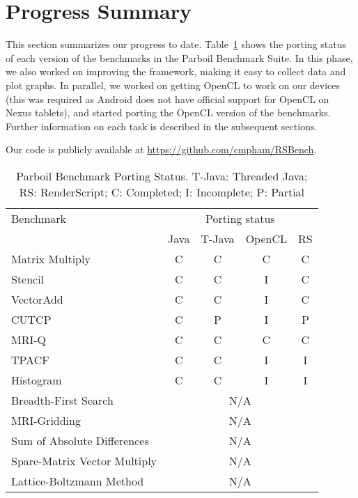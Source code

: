 \section*{Progress Summary}

This section summarizes our progress to date. Table~\ref{table:parboil} shows the
porting status of each version of the benchmarks in the Parboil Benchmark Suite.
In this phase, we also worked on improving the framework, making it easy to collect
data and plot graphs. In parallel, we worked on getting OpenCL to work on our
devices (this was required as Android does not have official support for OpenCL
on Nexus tablets), and started porting the OpenCL version of the benchmarks. 
Further information on each task is described in the subsequent sections.

Our code is publicly available at \url{https://github.com/cmpham/RSBench}.

\begin{table}[h]\small
\centering
\begin{tabular}{ | l | c | c | c | c |}
    \hline 
    Benchmark & \multicolumn{4}{|c|}{Porting status} \\ \cline{2-5}
              & Java & T-Java & OpenCL & RS \\ \hline
    Matrix Multiply & C & C & C & C \\ \hline
    Stencil & C & C & I & C \\ \hline
    VectorAdd & C & C & I & C \\ \hline
    CUTCP & C & P  & I  & P \\ \hline
    MRI-Q & C & C & C & C \\ \hline
    TPACF & C & C & I & I \\ \hline
    Histogram & C & C & I & I \\ \hline
    Breadth-First Search & \multicolumn{4}{|c|}{N/A} \\ \hline
    MRI-Gridding & \multicolumn{4}{|c|}{N/A} \\ \hline
    Sum of Absolute Differences & \multicolumn{4}{|c|}{N/A} \\ \hline
    Spare-Matrix Vector Multiply & \multicolumn{4}{|c|}{N/A} \\ \hline
    Lattice-Boltzmann Method & \multicolumn{4}{|c|}{N/A} \\ \hline
    \hline
\end{tabular}
\caption{Parboil Benchmark Porting Status. T-Java: Threaded Java; RS:
RenderScript; C: Completed; I: Incomplete; P: Partial}
\label{table:parboil}
\end{table}

